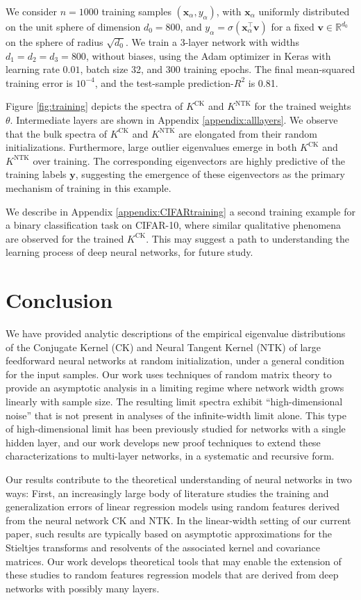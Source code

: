\documentclass{article}
\theoremstyle{definition}
\newcommand{\R}{\mathbb{R}}
\newcommand{\CK}{\text{CK}}
\newcommand{\NTK}{\text{NTK}}
\newcommand{\x}{\mathbf{x}}
\newcommand{\y}{\mathbf{y}}
\renewcommand{\v}{\mathbf{v}}
\renewcommand{\a}{\alpha}
\newcommand{\1}{\mathbf{1}}
\begin{document}
We consider $n=1000$ training samples $(\x_\a,y_\a)$, with $\x_\a$ uniformly
distributed on the unit sphere of dimension $d_0=800$,
and $y_\a=\sigma(\x_\a^\top \v)$ for a fixed $\v \in \R^{d_0}$ on the sphere of
radius $\sqrt{d_0}$. We train a 3-layer network with widths $d_1=d_2=d_3=800$,
without biases, using the Adam optimizer in Keras with learning rate $0.01$,
batch size 32, and 300 training epochs. The final mean-squared training
error is $10^{-4}$, and the test-sample prediction-$R^2$ is 0.81.

Figure \ref{fig:training} depicts the spectra of $K^\CK$ and $K^\NTK$ for the 
trained weights $\theta$. Intermediate layers are shown in Appendix
\ref{appendix:alllayers}. We observe that the bulk spectra of $K^\CK$ and
$K^\NTK$ are elongated from their random initializations.
Furthermore, large outlier eigenvalues emerge in both $K^\CK$ and $K^\NTK$
over training. The corresponding eigenvectors are highly predictive of the
training labels $\y$, suggesting the emergence of these eigenvectors
as the primary mechanism of training in this example.

We describe in Appendix \ref{appendix:CIFARtraining} a second
training example for a binary classification task on CIFAR-10, where similar
qualitative phenomena are observed for the trained $K^\CK$. This may suggest a
path to understanding the learning process of deep neural networks, for
future study.

\section{Conclusion}

We have provided analytic descriptions of the empirical
eigenvalue distributions of the Conjugate Kernel (CK) and Neural Tangent Kernel
(NTK) of large feedforward neural networks at random initialization,
under a general condition for the input samples. Our work uses techniques of
random matrix theory to provide an asymptotic analysis in a limiting regime
where network width grows linearly with sample size. The resulting limit
spectra exhibit ``high-dimensional noise'' that is not present in analyses
of the infinite-width limit alone. This type of high-dimensional limit has
been previously studied for networks with a single hidden layer, and our work
develops new proof techniques to extend these characterizations to multi-layer
networks, in a systematic and recursive form.

Our results contribute to the theoretical understanding of neural networks
in two ways: First, an increasingly large body of literature studies the
training and generalization errors of linear regression models using random
features derived from the neural network CK and NTK. In the linear-width setting
of our current paper, such results are typically based on asymptotic
approximations for the Stieltjes transforms and resolvents of the associated
kernel and covariance matrices. Our work develops theoretical tools that may
enable the extension of these studies to random features regression models that 
are derived from deep networks with possibly many layers.
\end{document}
